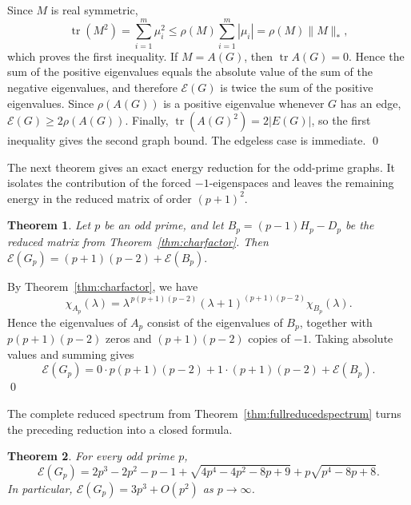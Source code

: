 \documentclass[12pt]{article}
\renewenvironment{proof}{{\bf \noindent Proof.}}{\qed}
\newtheorem{theorem}{Theorem}[section]
\theoremstyle{definition}
\newcommand{\tr}{\operatorname{tr}}
\begin{document}
	\begin{proof}
		Since $M$ is real symmetric,
		$$
		\tr(M^2)=\sum_{i=1}^m\mu_i^2
		\le \rho(M)\sum_{i=1}^m|\mu_i|
		=\rho(M)\|M\|_*,
		$$
		which proves the first inequality. If $M=A(G)$, then $\tr A(G)=0$. Hence the sum of the positive eigenvalues equals the absolute value of the sum of the negative eigenvalues, and therefore $\mathcal E(G)$ is twice the sum of the positive eigenvalues. Since $\rho(A(G))$ is a positive eigenvalue whenever $G$ has an edge, $\mathcal E(G)\ge2\rho(A(G))$. Finally, $\tr(A(G)^2)=2|E(G)|$, so the first inequality gives the second graph bound. The edgeless case is immediate.
	\end{proof}
	
	
	\medskip
	The next theorem gives an exact energy reduction for the odd-prime graphs. It isolates the contribution of the forced $-1$-eigenspaces and leaves the remaining energy in the reduced matrix of order $(p+1)^2$.	
	\begin{theorem}\label{thm:energyoddprime}
		Let $p$ be an odd prime, and let $B_p=(p-1)H_p-D_p$ be the reduced matrix from Theorem~\ref{thm:charfactor}. Then
		$\mathcal E(G_p)=(p+1)(p-2)+\mathcal E(B_p).$
	\end{theorem}
	
	\begin{proof}
		By Theorem~\ref{thm:charfactor}, we have
		$$
		\chi_{A_p}(\lambda)
		=
		\lambda^{\,p(p+1)(p-2)}(\lambda+1)^{(p+1)(p-2)}\chi_{B_p}(\lambda).
		$$
		Hence the eigenvalues of $A_p$ consist of the eigenvalues of $B_p$, together with $p(p+1)(p-2)$ zeros and $(p+1)(p-2)$ copies of $-1$. Taking absolute values and summing gives
		$$
		\mathcal E(G_p)=0\cdot p(p+1)(p-2)+1\cdot (p+1)(p-2)+\mathcal E(B_p).
		$$
	\end{proof}
	
	\medskip
	The complete reduced spectrum from Theorem~\ref{thm:fullreducedspectrum} turns the preceding reduction into a closed formula.
	
	\begin{theorem}\label{thm:exactenergyodd}
		For every odd prime $p$,
		$$
		\mathcal E(G_p)
		=2p^3-2p^2-p-1
		+\sqrt{4p^4-4p^2-8p+9}
		+p\sqrt{p^4-8p+8}.
		$$
		In particular, $\mathcal E(G_p)=3p^3+O(p^2)$ as $p\to\infty$.
	\end{theorem}
	
\end{document}
